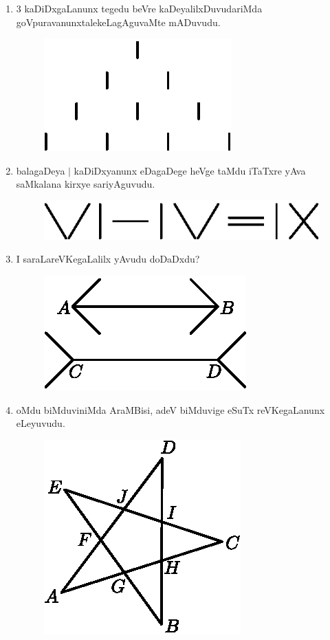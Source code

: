 \begin{enumerate}
\item $3$ kaDiDxgaLanunx tegedu beVre kaDeyalilxDuvudariMda goVpuravanunx\break talekeLagAguvaMte mADuvudu.
\begin{figure}[H]
\centering
\includegraphics{src/figures/exr42.eps}
\end{figure}

\item balagaDeya $|$ kaDiDxyanunx eDagaDege heVge taMdu iTaTxre yAva saMkalana kirxye sariyAguvudu.
\begin{figure}[H]
\centering
\includegraphics{src/figures/exr43.eps}
\end{figure}

\item I saraLareVKegaLalilx yAvudu doDaDxdu?
\begin{figure}[H]
\centering
\includegraphics{src/figures/exr44.eps}
\end{figure}

\eject

\item oMdu biMduviniMda AraMBisi, adeV biMduvige eSuTx reVKegaLanunx eLeyuvudu.
\begin{figure}[H]
\centering
\includegraphics{src/figures/exr45.eps}
\end{figure}


\end{enumerate}
